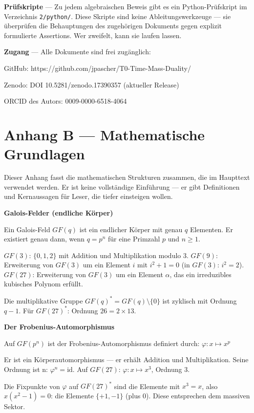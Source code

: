 \documentclass[11pt,oneside]{book}
\begin{document}
\textbf{Prüfskripte} — Zu jedem algebraischen Beweis gibt es ein Python-Prüfskript
im Verzeichnis \texttt{2/python/}. Diese Skripte sind keine Ableitungswerkzeuge —
sie überprüfen die Behauptungen des zugehörigen Dokuments gegen explizit
formulierte Assertions. Wer zweifelt, kann sie laufen lassen.


\textbf{Zugang} — Alle Dokumente sind frei zugänglich:


GitHub: https://github.com/jpascher/T0-Time-Mass-Duality/


Zenodo: DOI 10.5281/zenodo.17390357 (aktueller Release)


ORCID des Autors: 0009-0000-6518-4064






\chapter*{Anhang B — Mathematische Grundlagen}

Dieser Anhang fasst die mathematischen Strukturen zusammen, die im
Haupttext verwendet werden. Er ist keine vollständige Einführung —
er gibt Definitionen und Kernaussagen für Leser, die tiefer einsteigen
wollen.


\textbf{Galois-Felder (endliche Körper)}


Ein Galois-Feld $GF(q)$ ist ein endlicher Körper mit genau $q$ Elementen.
Er existiert genau dann, wenn $q = p^n$ für eine Primzahl $p$ und $n \geq 1$.


$GF(3)$: $\{0, 1, 2\}$ mit Addition und Multiplikation modulo 3.
$GF(9)$: Erweiterung von $GF(3)$ um ein Element $i$ mit $i^2 + 1 = 0$ (in
$GF(3)$: $i^2 = 2$).
$GF(27)$: Erweiterung von $GF(3)$ um ein Element $\alpha$, das ein irreduzibles
kubisches Polynom erfüllt.


Die multiplikative Gruppe $GF(q)^* = GF(q)\setminus\{0\}$ ist zyklisch mit
Ordnung $q-1$. Für $GF(27)^*$: Ordnung $26 = 2\times 13$.


\textbf{Der Frobenius-Automorphismus}


Auf $GF(p^n)$ ist der Frobenius-Automorphismus definiert durch:
$\varphi: x \mapsto x^p$


Er ist ein Körperautomorphismus — er erhält Addition und Multiplikation.
Seine Ordnung ist n: $\varphi^n = \mathrm{id}$. Auf $GF(27)$: $\varphi: x \mapsto x^3$, Ordnung 3.


Die Fixpunkte von $\varphi$ auf $GF(27)^*$ sind die Elemente mit $x^3 = x$, also
$x(x^2-1) = 0$: die Elemente $\{+1, -1\}$ (plus 0). Diese entsprechen dem
massiven Sektor.
\end{document}
